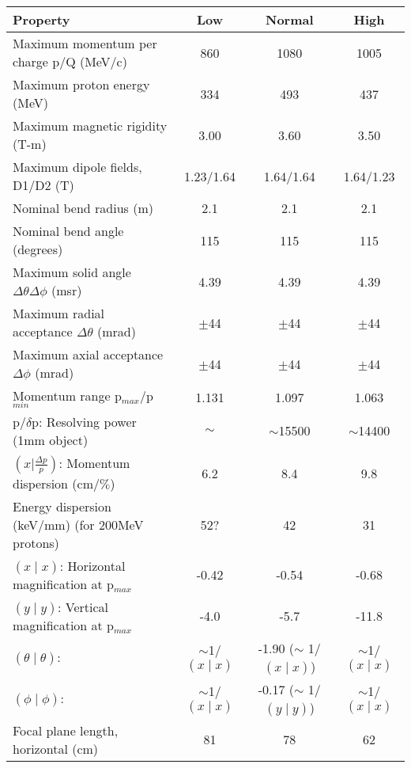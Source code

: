 \documentclass[11pt]{report}
\begin{document}
\begin{landscape}

\begin{table}
\centering
\begin{tabular}{|l|c|c|c|}
\hline
 Property &Low   &Normal   &High \\
\hline
Maximum momentum per charge p/Q (MeV/c)  &860 &1080  &1005\\
Maximum proton energy (MeV)  &334 &493 &437\\
Maximum magnetic rigidity (T-m) &3.00  &3.60  &3.50\\
Maximum dipole fields, D1/D2 (T) &1.23/1.64  &1.64/1.64 &1.64/1.23\\
Nominal bend radius (m)      &2.1&2.1&2.1 \\
Nominal bend angle (degrees)  &115&115&115\\
Maximum solid angle $\Delta\theta\Delta\phi$ (msr)  &4.39&4.39&4.39\\%
Maximum radial acceptance $\Delta\theta$ (mrad)   &$\pm$44&$\pm$44&$\pm$44\\
Maximum axial acceptance $\Delta\phi$ (mrad)   &$\pm$44&$\pm$44&$\pm$44\\
Momentum range p$_{max}$/p$_{min}$  &1.131  &1.097  &1.063\\
	p/$\delta$p: Resolving power (1mm object)    &$\sim$ & $\sim$15500 & $\sim$14400 \\
$(x|\frac{\Delta p}{p})$: Momentum dispersion (cm/$\%$)  &6.2  &8.4  &9.8\\
Energy dispersion (keV/mm) (for 200MeV protons)  &52?  &42  &31\\
$(x \mid x)$: Horizontal magnification at p$_{max}$  &-0.42 &-0.54                          &-0.68\\
$(y \mid y)$: Vertical magnification at p$_{max}$    &-4.0  &-5.7                           &-11.8\\
$(\theta \mid \theta)$:                              & $\sim$1/$(x \mid x)$    & -1.90 ($\sim$ 1/$(x \mid x)$) & $\sim$1/$(x \mid x)$   \\
$(\phi \mid \phi)$:                                  & $\sim$1/$(x \mid x)$    & -0.17 ($\sim$ 1/$(y \mid y)$) & $\sim$1/$(x \mid x)$   \\
Focal plane length, horizontal (cm)  &81  &78  &62\\

\end{tabular}
\end{table}
\end{landscape}
\end{document}

